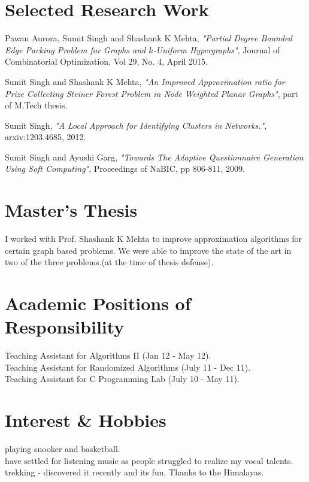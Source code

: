\documentclass[margin,line]{resume}
\begin{document}
\begin{resume}


    \section{\mysidestyle Selected Research Work}
\vspace{-2mm}
Pawan Aurora, Sumit Singh and Shashank K Mehta, \textit{"Partial Degree Bounded Edge Packing Problem for Graphs and $k$-Uniform Hypergraphs"}, Journal of Combinatorial Optimization, Vol 29, No. 4, April 2015. 

\vspace{-2mm}
Sumit Singh and Shashank K Mehta, \textit{ "An Improved Approximation ratio for Prize Collecting Steiner Forest Problem in Node Weighted Planar Graphs"}, part of M.Tech thesis.

\vspace{-2mm}
Sumit Singh, \textit{"A Local Approach for Identifying Clusters in Networks."}, arxiv:1203.4685, 2012.

\vspace{-2mm}
Sumit Singh and Ayushi Garg, \textit{"Towards The Adaptive Questionnaire Generation Using Soft Computing"}, Proceedings of NaBIC, pp 806-811, 2009.



    \section{\mysidestyle Master's Thesis}
I worked with Prof. Shashank K Mehta to improve approximation algorithms for certain graph based problems. We were able to improve the state of the art in two of the three problems.(at the time of thesis defense).
   

    \section{\mysidestyle Academic Positions of Responsibility} 
	Teaching Assistant for Algorithms II (Jan 12 - May 12).\\ 
	Teaching Assistant for Randomized Algorithms (July 11 - Dec 11).\\ 
	Teaching Assistant for C Programming Lab (July 10 - May 11).
    \section{\mysidestyle Interest \& Hobbies}
    playing snooker and basketball.\\
    have settled for listening music as people struggled to realize my vocal talents.\\
    trekking - discovered it recently and its fun. Thanks to the Himalayas.

\end{resume}
\end{document}
